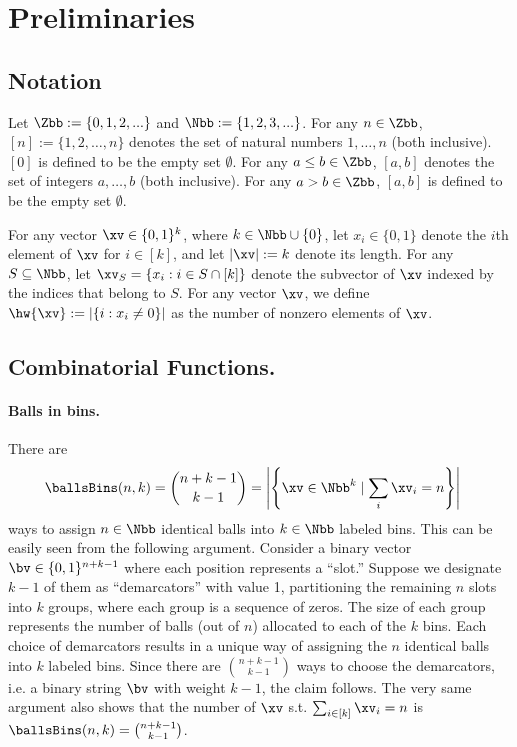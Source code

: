 \section{Preliminaries}\label{sec:prelim}

\subsection{Notation}\label{ssec:not}

Let $\Zbb:=\{0,1,2,...\}$ and $\Nbb:=\{1,2,3,...\}$.
For any $n \in \Zbb$, $[n] := \{1, 2, \ldots, n\}$ denotes the set of natural numbers $1, \ldots, n$ (both inclusive). $[0]$ is defined to be the empty set $\emptyset$. For any $a \le b \in \Zbb$, $[a,b]$ denotes the set of integers $a, \ldots, b$ (both inclusive). For any $a > b \in \Zbb$, $[a,b]$ is defined to be the empty set $\emptyset$. 

For any vector $\xv \in \{0,1\}^k$, where $k \in \Nbb\cup\{0\}$, let $x_i\in\{0,1\}$ denote the $i$th element of $\xv$ for $i \in [k]$, and let $|\xv| := k$ denote its length. For any $S\subseteq \Nbb$, let $\xv_{S} = \{x_i:i\in S\cap[k]\}$ denote the subvector of $\xv$ indexed by the indices that belong to $S$. 
For any vector $\xv$, we define $\hw{\xv} := |\{i:x_i\neq 0\}|$ as the number of nonzero elements of $\xv$.

\subsection{Combinatorial Functions.}\label{ssec:bb}

\paragraph{Balls in bins.} There are
\begin{align*}
\ballsBins(n,k)&={n+k-1\choose k-1}
= \left|\left\{ \xv\in \Nbb^k \mid \sum_i \xv_i = n \right\}\right|
\end{align*}
ways to assign $n \in \Nbb$ identical balls into $k \in \Nbb$ labeled bins. This can be easily seen from the following argument. Consider a binary vector $\bv\in\{0,1\}^{n+k-1}$ where each position represents a ``slot.'' Suppose we designate \(k - 1\) of them as ``demarcators'' with value 1, partitioning the remaining \(n\) slots into \(k\) groups, where each group is a sequence of zeros. The size of each group represents the number of balls (out of \(n\)) allocated to each of the \(k\) bins.
 Each choice of demarcators results in a unique way of assigning the $n$ identical balls into $k$ labeled bins. Since there are ${n+k-1\choose k-1}$ ways to choose the demarcators, i.e. a binary string $\bv$ with weight $k-1$, the claim follows. The very same argument also shows that the number of $\xv$ s.t. $\sum_{i\in[k]}\xv_i = n$ is $
\ballsBins(n,k)={n+k-1\choose k-1}
$.\\  

